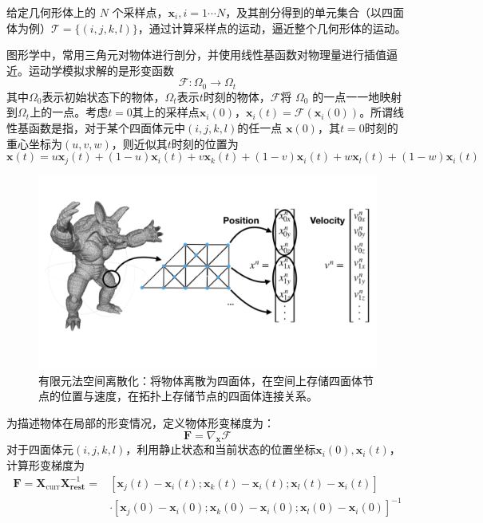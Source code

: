 给定几何形体上的 $N$ 个采样点，$\mathbf x_{i}, i = 1\cdots N$，及其剖分得到的单元集合（以四面体为例）$\mathcal T = \{(i, j, k, l)\}$，通过计算采样点的运动，逼近整个几何形体的运动。

图形学中，常用三角元对物体进行剖分，并使用线性基函数对物理量进行插值逼近。运动学模拟求解的是形变函数
$$
\mathcal F: \Omega_0 \rightarrow \Omega_t
$$
其中$\Omega_0$表示初始状态下的物体，$\Omega_t$表示$t$时刻的物体，$\mathcal F$将 $\Omega_0$ 的一点一一地映射到$\Omega_t$上的一点。考虑$t = 0$其上的采样点$\mathbf x_i(0)$，$\mathbf x_i(t) = \mathcal F(\mathbf x_i(0))$。所谓线性基函数是指，对于某个四面体元中$(i, j, k, l)$的任一点 $\mathbf x(0)$，其$t=0$时刻的重心坐标为$(u, v, w)$，则近似其$t$时刻的位置为
$$
\mathbf x(t) = u \mathbf x_j(t) + (1 - u)\mathbf{x}_i(t) + 
 v \mathbf x_k(t) + (1 - v) \mathbf{x}_i(t)
 + w \mathbf x_l(t) + (1 - w) \mathbf{x}_i(t)
$$


\begin{figure}[h!]
  \centering
  \includegraphics[width=0.9\linewidth]{img/Screenshot 2023-04-19 at 10.23.09.png}
  \caption{有限元法空间离散化：将物体离散为四面体，在空间上存储四面体节点的位置与速度，在拓扑上存储节点的四面体连接关系。}
\end{figure}

为描述物体在局部的形变情况，定义物体形变梯度为：
\begin{equation}\label{def:def-grad}
  \mathbf F = \nabla_{\mathbf x} \mathcal F
\end{equation}
对于四面体元$(i, j, k, l)$，利用静止状态和当前状态的位置坐标$\mathbf x_i(0), \mathbf x_i(t)$，计算形变梯度为
\begin{equation}\label{eq:deformation-grad-compute}
\begin{aligned}
  \mathbf F =\mathbf X_{\mathrm{curr}}\mathbf X_{\mathbf{rest}}^{-1} =& [\mathbf x_j(t) - \mathbf x_i(t);\mathbf x_k(t) - \mathbf x_i(t); \mathbf x_l(t) - \mathbf x_i(t)] \\
  &\cdot [\mathbf x_j(0) - \mathbf x_i(0);\mathbf x_k(0) - \mathbf x_i(0); \mathbf x_l(0) - \mathbf x_i(0)]^{-1}
\end{aligned}
\end{equation}

